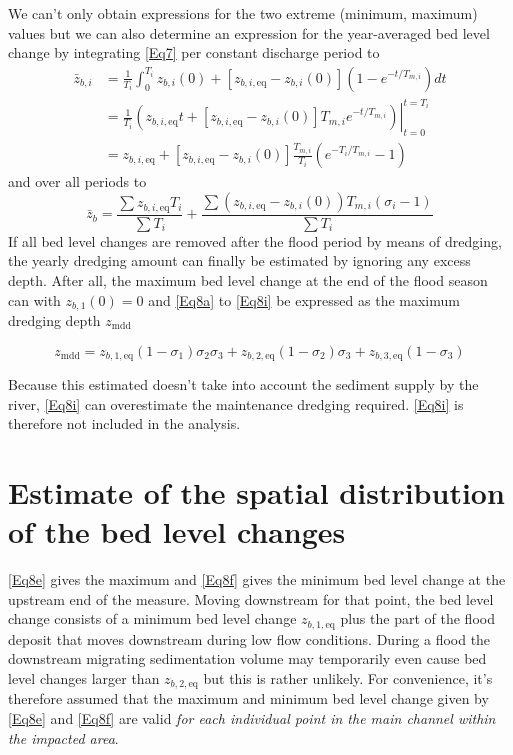We can't only obtain expressions for the two extreme (minimum, maximum) values but we can also determine an expression for the year-averaged bed level change by integrating \autoref{Eq7} per constant discharge period to
%
\begin{align}
\bar{z}_{b,i} &= \frac{1}{T_i} \int_0^{T_i}{z_{b,i} (0) + [z_{b,i,\text{eq}} - z_{b,i}(0)](1 - e^{-t/T_{m,i}})}dt \\
&= \frac{1}{T_i} \left . \left ( {z_{b,i,\text{eq}} t + [z_{b,i,\text{eq}} - z_{b,i}(0)]T_{m,i} e^{-t/T_{m,i}}} \right ) \right |_{t=0}^{t=T_i} \\
&= z_{b,i,\text{eq}} + [z_{b,i,\text{eq}} - z_{b,i}(0)] \frac{T_{m,i}}{T_i} ( e^{-T_i/T_{m,i}} - 1 )
\end{align}
%
and over all periods to
%
\begin{equation}
\bar{z}_b = \frac{\sum{z_{b,i,\text{eq}} T_i}}{\sum{T_i}} + \frac{\sum{(z_{b,i,\text{eq}}-z_{b,i}(0)) T_{m,i} (\sigma_i-1)}}{\sum{T_i}}
\label{Eq8h}
\end{equation}
%
If all bed level changes are removed after the flood period by means of dredging, the yearly dredging amount can finally be estimated by ignoring any excess depth.
After all, the maximum bed level change at the end of the flood season can with $z_{b,1}(0) = 0$ and \autoref{Eq8a} to \autoref{Eq8i} be expressed as the maximum dredging depth $z_\text{mdd}$

\begin{equation}
z_\text{mdd} = z_{b,1,\text{eq}}(1-\sigma_1) \sigma_2 \sigma_3 + z_{b,2,\text{eq}} (1-\sigma_2) \sigma_3 + z_{b,3,\text{eq}} (1-\sigma_3)
\label{Eq8i}
\end{equation}

Because this estimated doesn't take into account the sediment supply by the river, \autoref{Eq8i} can overestimate the maintenance dredging required.
\autoref{Eq8i} is therefore not included in the \dfastmi analysis.

\section{Estimate of the spatial distribution of the bed level changes}

\autoref{Eq8e} gives the maximum and \autoref{Eq8f} gives the minimum bed level change at the upstream end of the measure.
Moving downstream for that point, the bed level change consists of a minimum bed level change $z_{b,1,\text{eq}}$ plus the part of the flood deposit that moves downstream during low flow conditions.
During a flood the downstream migrating sedimentation volume may temporarily even cause bed level changes larger than $z_{b,2,\text{eq}}$ but this is rather unlikely.
For convenience, it's therefore assumed that the maximum and minimum bed level change given by \autoref{Eq8e} and \autoref{Eq8f} are valid \emph{for each individual point in the main channel within the impacted area}.


